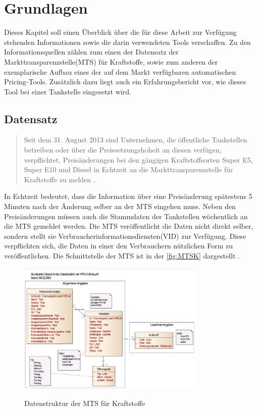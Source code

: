 \chapter{Grundlagen}
\label{sec:Grundlagen}

Dieses Kapitel soll einen Überblick über die für diese Arbeit zur Verfügung stehenden Informationen sowie die darin verwendeten Tools verschaffen. Zu den Informationsquellen zählen zum einen der Datensatz der Markttransparenzstelle(MTS) für Kraftstoffe, sowie zum anderen der exemplarische Aufbau eines der auf dem Markt verfügbaren automatischen Pricing-Tools. Zusätzlich dazu liegt auch ein Erfahrungsbericht vor, wie dieses Tool bei einer Tankstelle eingesetzt wird.

\section{Datensatz}
\begin{quote} 
\glqq Seit dem 31. August 2013 sind Unternehmen, die öffentliche Tankstellen betreiben oder über die Preissetzungshoheit an diesen verfügen, verpflichtet, Preisänderungen bei den gängigen Kraftstoffsorten Super E5, Super E10 und Diesel in Echtzeit an die Markttransparenzstelle für Kraftstoffe zu melden \citep*{BkMTS}.\grqq
\end{quote}

In Echtzeit bedeutet, dass die Information über eine Preisänderung spätestens 5 Minuten nach der Änderung selber an der MTS eingehen muss. Neben den Preisänderungen müssen auch die Stammdaten der Tankstellen wöchentlich an die MTS gemeldet werden. Die MTS veröffentlicht die Daten nicht direkt selber, sondern stellt sie Verbraucherinformationsdiensten(VID) zur Verfügung. Diese verpflichten sich, die Daten in einer den Verbrauchern nützlichen Form zu veröffentlichen. Die Schnittstelle der MTS ist in der \autoref{fig:MTSK} dargestellt \citep*{IMTSK}.

\begin{figure}
	\center
	\includegraphics[width=0.8\textwidth]{Bilder/Datenstruktur-MTS.png}\\
	\caption{Datenstruktur der MTS für Kraftstoffe}
	\label{fig:MTSK}
\end{figure}

